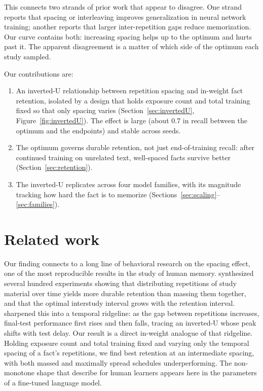 \documentclass[10pt]{article}
\begin{document}
This connects two strands of prior work that appear to disagree. One strand reports that spacing
or interleaving improves generalization in neural network training; another reports that larger
inter-repetition gaps reduce memorization. Our curve contains both: increasing spacing helps up to
the optimum and hurts past it. The apparent disagreement is a matter of which side of the optimum
each study sampled.

Our contributions are:
\begin{enumerate}
\item An inverted-U relationship between repetition spacing and in-weight fact retention, isolated
by a design that holds exposure count and total training fixed so that only spacing varies
(Section~\ref{sec:invertedU}, Figure~\ref{fig:invertedU}). The effect is large (about 0.7 in recall
between the optimum and the endpoints) and stable across seeds.
\item The optimum governs durable retention, not just end-of-training recall: after continued
training on unrelated text, well-spaced facts survive better (Section~\ref{sec:retention}).
\item The inverted-U replicates across four model families, with its magnitude tracking how hard the
fact is to memorize (Sections~\ref{sec:scaling}--\ref{sec:families}).
\end{enumerate}

\section{Related work}
\label{sec:related}

Our finding connects to a long line of behavioral research on the spacing effect, one of the most
reproducible results in the study of human memory. \citet{cepeda2006distributed} synthesized
several hundred experiments showing that distributing repetitions of study material over time
yields more durable retention than massing them together, and that the optimal interstudy interval
grows with the retention interval. \citet{cepeda2008spacing} sharpened this into a temporal
ridgeline: as the gap between repetitions increases, final-test performance first rises and then
falls, tracing an inverted-U whose peak shifts with test delay. Our result is a direct in-weight
analogue of that ridgeline. Holding exposure count and total training fixed and varying only the
temporal spacing of a fact's repetitions, we find best retention at an intermediate spacing, with
both massed and maximally spread schedules underperforming. The non-monotone shape that
\citet{cepeda2008spacing} describe for human learners appears here in the parameters of a
fine-tuned language model.
\end{document}
